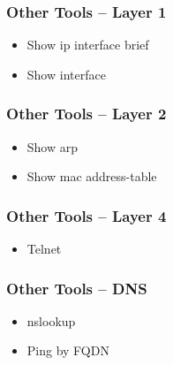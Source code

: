 \documentclass[pdflatex,compress,mathserif]{beamer}
\begin{document}
\begin{frame}
	\frametitle{Other Tools – Layer 1}
	\begin{itemize}
		\item Show ip interface brief
		\item Show interface
	\end{itemize}
\end{frame}

\begin{frame}
	\frametitle{Other Tools – Layer 2}
	\begin{itemize}
		\item Show arp
		\item Show mac address-table
	\end{itemize}
\end{frame}

\begin{frame}
	\frametitle{Other Tools – Layer 4}
	\begin{itemize}
		\item Telnet
	\end{itemize}
\end{frame}

\begin{frame}
	\frametitle{Other Tools – DNS}
	\begin{itemize}
		\item nslookup
		\item Ping by FQDN
	\end{itemize}
\end{frame}
\end{document}
